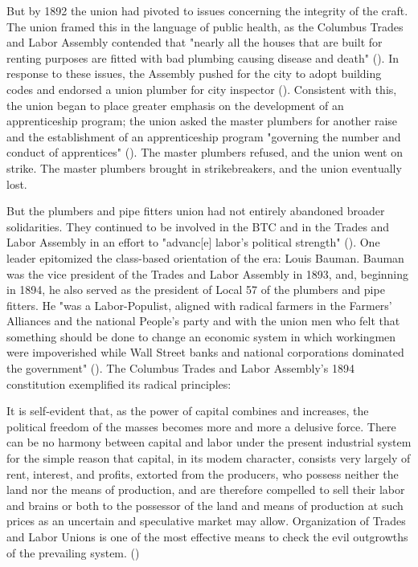 \documentclass[12pt]{article}
\renewenvironment{quote}
  {\list{}{\leftmargin=\parindent\rightmargin=0pt}%
   \item\relax}
  {\endlist}
\begin{document}
But by 1892 the union had pivoted to issues concerning the integrity of the craft. The union framed this in the language of public health, as the Columbus Trades and Labor Assembly contended that "nearly all the houses that are built for renting purposes are fitted with bad plumbing causing disease and death" (\cite[47–48]{schneirovPrideSolidarityHistory1993}). In response to these issues, the Assembly pushed for the city to adopt building codes and endorsed a union plumber for city inspector (\citeyear[48]{schneirovPrideSolidarityHistory1993}). Consistent with this, the union began to place greater emphasis on the development of an apprenticeship program; the union asked the master plumbers for another raise and the establishment of an apprenticeship program "governing the number and conduct of apprentices" (\citeyear[48]{schneirovPrideSolidarityHistory1993}). The master plumbers refused, and the union went on strike. The master plumbers brought in strikebreakers, and the union eventually lost.

But the plumbers and pipe fitters union had not entirely abandoned broader solidarities. They continued to be involved in the BTC and in the Trades and Labor Assembly in an effort to "advanc[e] labor’s political strength" (\cite[50]{schneirovPrideSolidarityHistory1993}). One leader epitomized the class-based orientation of the era: Louis Bauman. Bauman was the vice president of the Trades and Labor Assembly in 1893, and, beginning in 1894, he also served as the president of Local 57 of the plumbers and pipe fitters. He "was a Labor-Populist, aligned with radical farmers in the Farmers’ Alliances and the national People’s party and with the union men who felt that something should be done to change an economic system in which workingmen were impoverished while Wall Street banks and national corporations dominated the government" (\citeyear[50]{schneirovPrideSolidarityHistory1993}). The Columbus Trades and Labor Assembly’s 1894 constitution exemplified its radical principles:

\begin{quote}
It is self-evident that, as the power of capital combines and increases, the political freedom of the masses becomes more and more a delusive force. There can be no harmony between capital and labor under the present industrial system for the simple reason that capital, in its modem character, consists very largely of rent, interest, and profits, extorted from the producers, who possess neither the land nor the means of production, and are therefore compelled to sell their labor and brains or both to the possessor of the land and means of production at such prices as an uncertain and speculative market may allow. Organization of Trades and Labor Unions is one of the most effective means to check the evil outgrowths of the prevailing system. (\cite[50]{schneirovPrideSolidarityHistory1993})
\end{quote}
\end{document}

